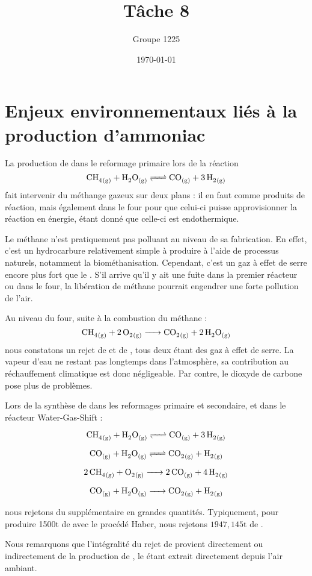 \documentclass[a4paper, oneside, 12pt]{article}
\title{Tâche 8}
\author{Groupe 1225}
\date{\today}
\begin{document}
\maketitle

\section*{Enjeux environnementaux liés à la production d'ammoniac}

La production de  dans le reformage primaire lors de la réaction
\[ \ce{CH4_{(g)} + H2O_{(g)} <=> CO_{(g)} + 3 \, H2_{(g)}} \]
fait intervenir du méthange gazeux sur deux plans : il en faut comme produits de réaction,
mais également dans le four pour que celui-ci puisse approvisionner la réaction en énergie,
étant donné que celle-ci est endothermique. 

Le méthane n'est pratiquement pas polluant au niveau de sa fabrication. 
En effet, c'est un hydrocarbure relativement simple à produire à l'aide 
de processus naturels, notamment la biométhanisation. 
Cependant, c'est un gaz à effet de serre encore plus fort que le .
S'il arrive qu'il y ait une fuite dans la premier réacteur ou dans le four, 
la libération de méthane pourrait engendrer une forte pollution de l'air.

Au niveau du four, suite à la combustion du méthane : 
\[ \ce{CH4_{(g)} + 2 \, O2_{(g)} -> CO2_{(g)} + 2 \, H2O_{(g)}} \] 
nous constatons un rejet de  et de , 
tous deux étant des gaz à effet de serre. 
La vapeur d'eau ne restant pas longtemps dans l'atmosphère,
sa contribution au réchauffement climatique est donc négligeable. 
Par contre, le dioxyde de carbone pose plus de problèmes. 

Lors de la synthèse de  dans les reformages primaire et secondaire, 
et dans le réacteur Water-Gas-Shift : 

\[ \ce{CH4_{(g)} + H2O_{(g)} <=> CO_{(g)} + 3 \, H2_{(g)}} \]

\[ \ce{CO_{(g)} + H2O_{(g)} <=> CO2_{(g)} + H2_{(g)}} \]

\[ \ce{2 \, CH4_{(g)} + O2_{(g)} -> {2} \, CO_{(g)} + 4 \, H2_{(g)}} \]
	
\[ \ce{CO_{(g)} + H2O_{(g)} -> CO2_{(g)} + H2_{(g)}} \]

nous rejetons du  supplémentaire en grandes quantités. 
Typiquement, pour produire 1500t de  avec le procédé Haber, 
nous rejetons $1947,145\si{\tonne}$ de .

Nous remarquons que l'intégralité du rejet de  provient directement 
ou indirectement de la production de , le  étant extrait 
directement depuis l'air ambiant.
\end{document}
